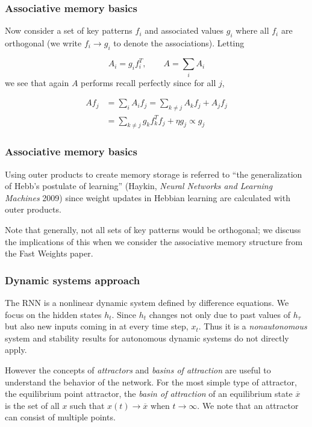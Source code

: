 \documentclass{beamer}
\begin{document}
\begin{frame}
  \frametitle{Associative memory basics}
Now consider a set of key patterns $f_i$ and associated values $g_i$ where all $f_i$ are orthogonal (we write $f_i \rightarrow g_i$ to denote the associations). Letting

\begin{equation*}
A_i = g_i f_i^T, \qquad A = \sum_{i} A_i
\end{equation*}
%
we see that again $A$ performs recall perfectly since for all $j$,

\begin{align*}
  A f_j & = \sum_{i}A_i f_j = \sum_{k \neq j} A_k f_j + A_j f_j \\
  & = \sum_{k \neq j} g_k f_k^T f_j + \eta g_j \propto g_j
\end{align*}
%
\end{frame}

\begin{frame}
  \frametitle{Associative memory basics}
  Using outer products to create memory storage is referred to ``the generalization of Hebb's postulate of learning'' (Haykin, \emph{Neural Networks and Learning Machines} 2009) since weight updates in Hebbian learning are calculated with outer products.

  \vspace{0.5cm}

  Note that generally, not all sets of key patterns would be orthogonal; we discuss the implications of this when we consider the associative memory structure from the Fast Weights paper.
\end{frame}

\begin{frame}
  \frametitle{Dynamic systems approach}
  The RNN is a nonlinear dynamic system defined by difference equations. We focus on the hidden states $h_t$. Since $h_t$ changes not only due to past values of $h_\tau$ but also new inputs coming in at every time step, $x_t$. Thus it is a \emph{nonautonomous} system and stability results for autonomous dynamic systems do not directly apply.

  \vspace{0.5cm}

  However the concepts of \emph{attractors} and \emph{basins of attraction} are useful to understand the behavior of the network. For the most simple type of attractor, the equilibrium point attractor, the \emph{basin of attraction} of an equilibrium state $\overline{x}$ is the set of all $x$ such that $x(t) \to \overline{x}$ when $t \to \infty$. We note that an attractor can consist of multiple points.
\end{frame}
\end{document}
